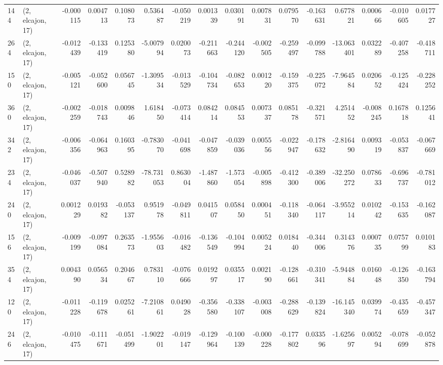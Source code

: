 \begin{tabular}{llrrrrrrrrrrrrrr}
144 &  (2, elcajon, 17) &  -0.000115 &  0.004713 &  0.108073 &    0.536487 & -0.050219 &   0.001339 &  0.030191 &  0.007831 &  0.079570 & -0.163631 &    0.677821 &  0.000666 & -0.010605 &  0.017727 \\
264 &  (2, elcajon, 17) &  -0.012439 & -0.133419 &  0.125380 &   -5.007994 &  0.020073 &  -0.211663 & -0.244120 & -0.002505 & -0.259497 & -0.099788 &  -13.063401 &  0.032289 & -0.407258 & -0.418711 \\
150 &  (2, elcajon, 17) &  -0.005121 & -0.052600 &  0.056745 &   -1.309534 & -0.013529 &  -0.104734 & -0.082653 &  0.001220 & -0.159375 & -0.225072 &   -7.964584 &  0.020652 & -0.125424 & -0.228252 \\
360 &  (2, elcajon, 17) &  -0.002259 & -0.018743 &  0.009846 &    1.618450 & -0.073414 &   0.084214 &  0.084553 &  0.007337 &  0.085178 & -0.321571 &    4.251452 & -0.008245 &  0.167818 &  0.125641 \\
342 &  (2, elcajon, 17) &  -0.006356 & -0.064963 &  0.160395 &   -0.783070 & -0.041698 &  -0.047859 & -0.039036 &  0.005556 & -0.022947 & -0.178632 &   -2.816490 &  0.009319 & -0.053837 & -0.067669 \\
234 &  (2, elcajon, 17) &  -0.046037 & -0.507940 &  0.528982 &  -78.731053 &  0.863004 &  -1.487860 & -1.573054 & -0.005898 & -0.412300 & -0.389006 &  -32.250272 &  0.078633 & -0.696737 & -0.781012 \\
240 &  (2, elcajon, 17) &   0.001229 &  0.019382 & -0.053137 &    0.951978 & -0.049811 &   0.041507 &  0.058450 &  0.000451 & -0.118340 & -0.064117 &   -3.955214 &  0.010242 & -0.153635 & -0.162087 \\
156 &  (2, elcajon, 17) &  -0.009199 & -0.097084 &  0.263573 &   -1.955603 & -0.016482 &  -0.136549 & -0.104994 &  0.005224 &  0.018440 & -0.344006 &    0.314376 &  0.000735 &  0.075799 &  0.010183 \\
354 &  (2, elcajon, 17) &   0.004390 &  0.056534 &  0.204667 &    0.783110 & -0.076666 &   0.019297 &  0.035517 &  0.002190 & -0.128661 & -0.310341 &   -5.944884 &  0.016048 & -0.126350 & -0.163794 \\
120 &  (2, elcajon, 17) &  -0.011228 & -0.119678 &  0.025261 &   -7.210861 &  0.049028 &  -0.356580 & -0.338107 & -0.003008 & -0.288629 & -0.139824 &  -16.145340 &  0.039974 & -0.435659 & -0.457347 \\
246 &  (2, elcajon, 17) &  -0.010475 & -0.111671 & -0.051499 &   -1.902201 & -0.019147 &  -0.129964 & -0.100139 & -0.000228 & -0.177802 &  0.033596 &   -1.625697 &  0.005294 & -0.078699 & -0.052878 \\

\end{tabular}
